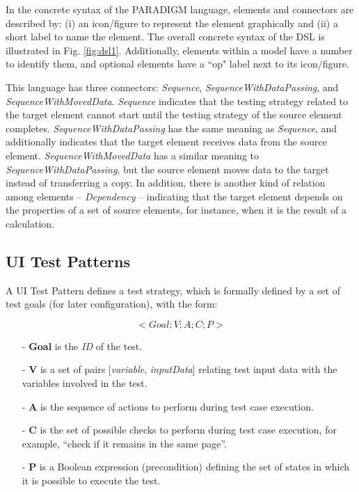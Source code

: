 \documentclass[10pt, conference, compsocconf]{IEEEtran}
\begin{document}
In the concrete syntax of the PARADIGM language, elements and connectors are described by: (i) an icon/figure to represent the element graphically and (ii) a short label to name the element. The overall concrete syntax of the DSL is illustrated in Fig. \ref{fig:dsl1}. Additionally, elements within a model have a number to identify them, and optional elements have a ``op" label next to its icon/figure.

This language has three connectors: \textit{Sequence}, \textit{SequenceWithDataPassing}, and \textit{SequenceWithMovedData}. \textit{Sequence} indicates that the testing strategy related to the target element cannot start until the testing strategy of the source element completes. \textit{SequenceWithDataPassing} has the same meaning as \textit{Sequence}, and additionally indicates that the target element receives data from the source element. \textit{SequenceWithMovedData} has a similar meaning to \textit{SequenceWithDataPassing}, but the source element moves data to the target instead of transferring a copy. In addition, there is another kind of relation among elements -- \textit{Dependency} -- indicating that the target element depends on the properties of a set of source elements, for instance, when it is the result of a calculation. 

\subsection{UI Test Patterns}\label{sec:uitp}

A UI Test Pattern defines a test strategy, which is formally defined by a set of test goals (for later configuration)\cite{moreira2013pattern}, with the form:

\begin{equation}< Goal; V; A; C; P >\end{equation}\label{eq:ui_}

\begin{itemize}
\item[-] \textbf{Goal} is the \textit{ID} of the test. 
\item[-] \textbf{V} is a set of pairs { [\textit{variable}, \textit{inputData}] } relating test input data with the variables involved in the test. 
\item[-] \textbf{A} is the sequence of actions to perform during test case execution. 
\item[-] \textbf{C} is the set of possible checks to perform during test case execution, for example, “check if it remains in the same page”. 
\item[-] \textbf{P} is a Boolean expression (precondition) defining the set of states in which it is possible to execute the test. 
\end{itemize}
\end{document}
